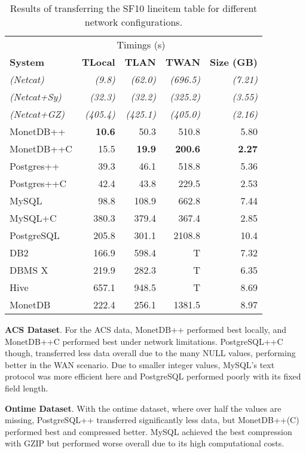 \documentclass[sigconf]{acmart}
\begin{document}
\begin{table}[h!]
    \centering
    \caption{Results of transferring the SF10 lineitem table for different network configurations.}
    \begin{tabular}{ l | r  r  r  r }
    		 & \multicolumn{3}{c}{Timings (s)} &  \\ 
        \textbf{System} & \textbf{T{\small Local}} & \textbf{T{\small LAN}} & \textbf{T{\small WAN}} &  \textbf{Size (GB)}\\ \hline
        \textit{(Netcat)} & \textit{(9.8)} & \textit{(62.0)} & \textit{(696.5)} & \textit{(7.21)} \\ 
        \textit{(Netcat+Sy)} & \textit{(32.3)} & \textit{(32.2)} & \textit{(325.2)} & \textit{(3.55)} \\ 
        \textit{(Netcat+GZ)} & \textit{(405.4)} & \textit{(425.1)} & \textit{(405.0)} & \textit{(2.16)} \\ 
        MonetDB++ & \textbf{10.6} & 50.3 & 510.8 & 5.80 \\ 
        MonetDB++C & 15.5 & \textbf{19.9} & \textbf{200.6} & \textbf{2.27} \\ 
        Postgres++ & 39.3 & 46.1 & 518.8 & 5.36 \\ 
        Postgres++C & 42.4 & 43.8 & 229.5 & 2.53 \\ 
        MySQL & 98.8 & 108.9 & 662.8 & 7.44 \\ 
        MySQL+C & 380.3 & 379.4 & 367.4 & 2.85 \\ 
        PostgreSQL & 205.8 & 301.1 & 2108.8 & 10.4 \\ 
        DB2 & 166.9 & 598.4 & T & 7.32 \\ 
        DBMS X & 219.9 & 282.3 & T & 6.35 \\ 
        Hive & 657.1 & 948.5 & T & 8.69 \\ 
        MonetDB & 222.4 & 256.1 & 1381.5 & 8.97 \\ 
    \end{tabular}
\end{table}

\textbf{ACS Dataset}. For the ACS data, MonetDB++ performed best locally, and MonetDB++C performed best under network limitations. PostgreSQL++C though, transferred less data overall due to the many NULL values, performing better in the WAN scenario. Due to smaller integer values, MySQL's text protocol was more efficient here and PostgreSQL performed poorly with its fixed field length. 

\textbf{Ontime Dataset}. With the ontime dataset, where over half the values are missing, PostgreSQL++ transferred significantly less data, but MonetDB++(C) performed best and compressed better. MySQL achieved the best compression with GZIP but performed worse overall due to its high computational costs. 
\end{document}
